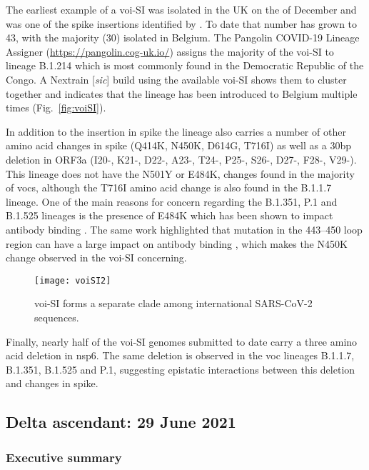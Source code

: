 The earliest example of a \gls{voi}-SI was isolated in the UK on the  of December and was one of the spike insertions identified by \citet{garry2021spike}.
To date that number has grown to 43, with the majority (30) isolated in Belgium.
The Pangolin COVID-19 Lineage Assigner (\url{https://pangolin.cog-uk.io/}) assigns the majority of the \gls{voi}-SI to lineage B.1.214 which is most commonly found in the Democratic Republic of the Congo.
A Nextrain [\textit{sic}] build using the available \gls{voi}-SI shows them to cluster together and indicates that the lineage has been introduced to Belgium multiple times (Fig.~\ref{fig:voiSI}).

In addition to the insertion in spike the lineage also carries a number of other amino acid changes in spike (Q414K, N450K, D614G, T716I) as well as a 30bp deletion in ORF3a (I20-, K21-, D22-, A23-, T24-, P25-, S26-, D27-, F28-, V29-).
This lineage does not have the N501Y or E484K, changes found in the majority of \gls{voc}s, although the T716I amino acid change is also found in the B.1.1.7 lineage.
One of the main reasons for concern regarding the B.1.351, P.1 and B.1.525 lineages is the presence of E484K which has been shown to impact antibody binding \citep{Greaney2021}.
The same work highlighted that mutation in the 443--450 loop region can have a large impact on antibody binding \citep{Greaney2021}, which makes the N450K change observed in the \gls{voi}-SI concerning.

\begin{figure}[ht]
  \centering
  \texttt{[image: voiSI2]}
  \caption[VOI-SI clade]{\gls{voi}-SI forms a separate clade among international SARS-CoV-2 sequences.}
  \label{fig:voiSI2}
\end{figure}

Finally, nearly half of the \gls{voi}-SI genomes submitted to date carry a three amino acid deletion in nsp6.
The same deletion is observed in the \gls{voc} lineages B.1.1.7, B.1.351, B.1.525 and P.1, suggesting epistatic interactions between this deletion and changes in spike.

\subsection{Delta ascendant: 29 June 2021}
\subsubsection{Executive summary}

